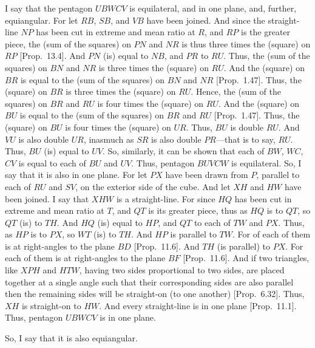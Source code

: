 I say that the pentagon $UBWCV$ is equilateral, and in one plane, and,
further, equiangular. For let $RB$, $SB$, and $VB$ have been joined. 
And since the straight-line $NP$ has been cut in extreme and mean
ratio at $R$, and $RP$ is the greater piece,  the (sum of the squares)
on $PN$ and $NR$ is thus three times the (square) on $RP$ [Prop.~13.4].
And $PN$ (is) equal to $NB$, and $PR$ to $RU$. 
Thus, the (sum of the squares) on $BN$ and $NR$ is three times the
(square) on $RU$. And the (square) on $BR$ is equal to the (sum of the squares) on $BN$ and $NR$ [Prop.~1.47].  
Thus, the (square) on $BR$ is three times the (square) on $RU$. 
Hence, the (sum of the
squares) on $BR$ and $RU$ is four times the (square) on $RU$. And
the (square)
on $BU$ is equal to the (sum of the squares) on $BR$ and $RU$ [Prop.~1.47]. Thus, the (square) on $BU$ is four times the
(square) on $UR$.  Thus, $BU$ is double $RU$.  And
$VU$ is also double $UR$, inasmuch as $SR$ is also double $PR$---that is to say, $RU$. Thus, $BU$ (is) equal to $UV$. So, similarly, it can be shown
that  each of $BW$, $WC$, $CV$ is equal to each of $BU$ and $UV$. 
Thus, pentagon $BUVCW$ is equilateral. So, I say that it is also in one plane. For let $PX$ have been drawn from $P$, parallel to
each of $RU$ and $SV$, on the exterior side of the cube. And let
$XH$ and $HW$ have been joined. I say that $XHW$ is a straight-line.
For since $HQ$ has been cut in extreme and mean ratio at $T$,
and  $QT$  is its greater piece, thus as $HQ$ is to $QT$, so $QT$
(is) to $TH$. And $HQ$ (is) equal to $HP$, and $QT$ to each of
$TW$ and $PX$. Thus, as $HP$ is to $PX$, so $WT$ (is) to
$TH$. And $HP$ is parallel to $TW$. For of each of them is at right-angles
to the plane $BD$ [Prop.~11.6]. And $TH$ (is parallel) to
$PX$. For each of them is at right-angles to the plane $BF$ [Prop.~11.6].
And if two triangles, like
$XPH$ and $HTW$, having two sides proportional to two sides,
are placed together at a single angle  such that their corresponding sides are also parallel then the remaining sides will be straight-on (to one another) [Prop.~6.32]. Thus, $XH$ is straight-on to
$HW$. And every straight-line is in one plane [Prop.~11.1]. Thus,
pentagon $UBWCV$ is in one plane.

So, I say that it is also equiangular.

